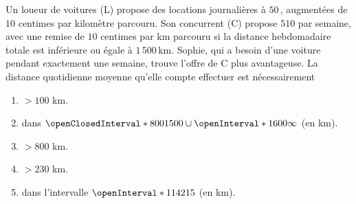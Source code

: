%
Un loueur de voitures (L) propose des locations journalières à $50$\,\currency, augmentées de $10$ centimes par kilomètre %
parcouru. Son concurrent (C) propose $510$\,\currency\,par semaine, avec une remise de $10$ centimes par km parcouru si la %
distance hebdomadaire totale est inférieure ou égale à $1\,500$\,km. Sophie, qui a besoin d'une voiture pendant exactement %
une semaine, trouve l'offre de C plus avantageuse. La distance quotidienne moyenne qu'elle compte effectuer est nécessairement
%
\begin{enumerate}
  \item $> 100$ km.
  \item dans $\openClosedInterval*{800}{1500}\cup\openInterval*{1600}{\infty}$ (en km).
  \item $> 800$ km.
  \item $> 230$ km.
  \item dans l'intervalle $\openInterval*{114}{215}$ (en km).
\end{enumerate}
%
